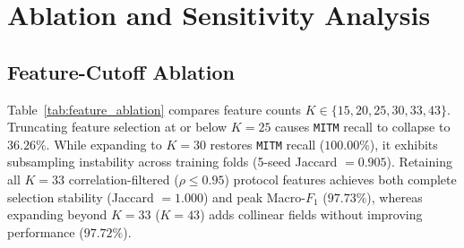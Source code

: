 \documentclass[10pt,journal,twocolumn]{IEEEtran}
\begin{document}
\section{Ablation and Sensitivity Analysis}

\subsection{Feature-Cutoff Ablation}
Table~\ref{tab:feature_ablation} compares feature counts $K \in \{15, 20, 25, 30, 33, 43\}$. Truncating feature selection at or below $K=25$ causes \texttt{MITM} recall to collapse to $36.26\%$. While expanding to $K=30$ restores \texttt{MITM} recall ($100.00\%$), it exhibits subsampling instability across training folds (5-seed Jaccard $=0.905$). Retaining all $K=33$ correlation-filtered ($\rho \le 0.95$) protocol features achieves both complete selection stability (Jaccard $=1.000$) and peak Macro-$F_1$ ($97.73\%$), whereas expanding beyond $K=33$ ($K=43$) adds collinear fields without improving performance ($97.72\%$).

\begin{table}[h]
\centering
\caption{Feature Selection Sensitivity, Stability, and Cutoff Ablation ($N=23,670$)}
\label{tab:feature_ablation}
\end{table}
\end{document}
